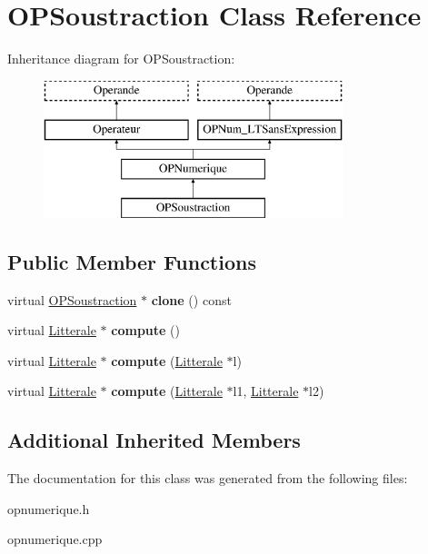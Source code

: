 \hypertarget{class_o_p_soustraction}{}\section{O\+P\+Soustraction Class Reference}
\label{class_o_p_soustraction}
Inheritance diagram for O\+P\+Soustraction\+:\begin{figure}[H]
\begin{center}
\leavevmode
\includegraphics[height=4.000000cm]{class_o_p_soustraction}
\end{center}
\end{figure}
\subsection*{Public Member Functions}
\begin{DoxyCompactItemize}
\item 
virtual \hyperlink{class_o_p_soustraction}{O\+P\+Soustraction} $\ast$ {\bfseries clone} () const \hypertarget{class_o_p_soustraction_a4e7ca9166e50f0c281eea55db792244a}{}\label{class_o_p_soustraction_a4e7ca9166e50f0c281eea55db792244a}

\item 
virtual \hyperlink{class_litterale}{Litterale} $\ast$ {\bfseries compute} ()\hypertarget{class_o_p_soustraction_a6926b8b60c9bb6bcaf91ef042f347dc3}{}\label{class_o_p_soustraction_a6926b8b60c9bb6bcaf91ef042f347dc3}

\item 
virtual \hyperlink{class_litterale}{Litterale} $\ast$ {\bfseries compute} (\hyperlink{class_litterale}{Litterale} $\ast$l)\hypertarget{class_o_p_soustraction_a9ac5ca3bd73414d5e3033e9d63ad7740}{}\label{class_o_p_soustraction_a9ac5ca3bd73414d5e3033e9d63ad7740}

\item 
virtual \hyperlink{class_litterale}{Litterale} $\ast$ {\bfseries compute} (\hyperlink{class_litterale}{Litterale} $\ast$l1, \hyperlink{class_litterale}{Litterale} $\ast$l2)\hypertarget{class_o_p_soustraction_af4ef17eac91bbf0f41475479e9817179}{}\label{class_o_p_soustraction_af4ef17eac91bbf0f41475479e9817179}

\end{DoxyCompactItemize}
\subsection*{Additional Inherited Members}


The documentation for this class was generated from the following files\+:\begin{DoxyCompactItemize}
\item 
opnumerique.\+h\item 
opnumerique.\+cpp\end{DoxyCompactItemize}
